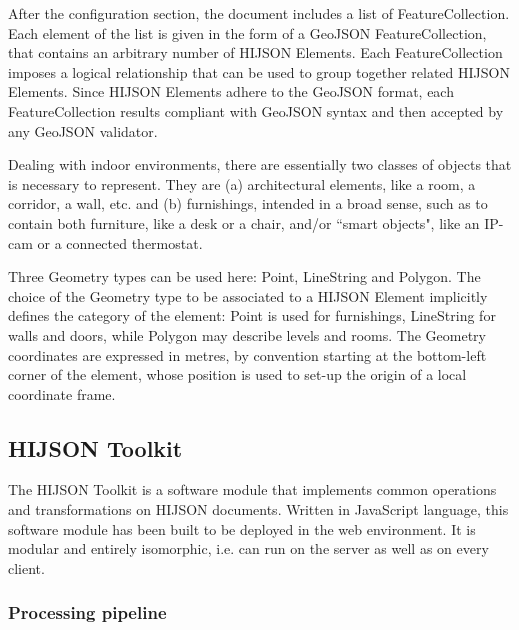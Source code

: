 \documentclass[]{egpubl}
\begin{document}
After the configuration section, the document includes a list of
FeatureCollection.  Each element of the list is given in the form of a GeoJSON
FeatureCollection, that contains an arbitrary number of HIJSON Elements. Each
FeatureCollection imposes a logical relationship that can be used to group
together related HIJSON Elements. Since HIJSON Elements adhere to the GeoJSON
format, each FeatureCollection results compliant with GeoJSON syntax and then
accepted by any GeoJSON validator.

Dealing with indoor environments, there are essentially two classes of objects
that is necessary to represent. They are (a) architectural elements, like a
room, a corridor, a wall, etc. and (b) furnishings, intended in a broad sense,
such as to contain both furniture, like a desk or a chair, and/or ``smart
objects", like an IP-cam or a connected thermostat.

Three Geometry types can be used here: Point, LineString and Polygon. The
choice of the Geometry type to be associated to a HIJSON Element implicitly
defines the category of the element: Point is used for furnishings, LineString
for walls and doors, while Polygon may describe levels and rooms. The Geometry
coordinates are expressed in metres, by convention starting at the bottom-left
corner of the element, whose position is used to set-up the origin of a local
coordinate frame.

\subsection{HIJSON Toolkit}

The HIJSON Toolkit is a software module that implements common operations and
transformations on HIJSON documents. Written in JavaScript language, this
software module has been built to be deployed in the web environment. It is
modular and entirely isomorphic, i.e. can run on the server as well as on
every client.

\subsubsection*{Processing pipeline}  
\end{document}
